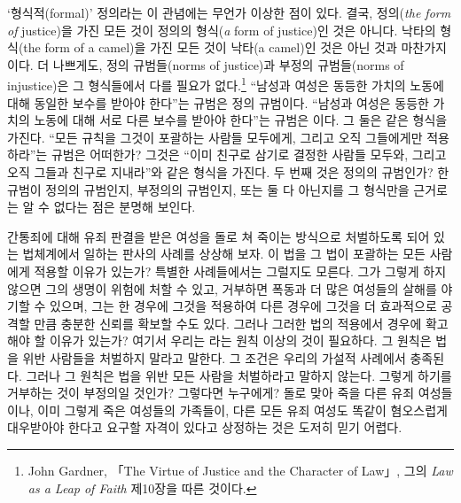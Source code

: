 ‘형식적(formal)’ 정의라는 이 관념에는 무언가 이상한 점이 있다. 결국,
정의(\emph{the form of} justice)을 가진 모든 것이 정의의
 형식(\emph{a} form of justice)인 것은 아니다. 낙타의 형식(the
form of a camel)을 가진 모든 것이 낙타(a camel)인 것은 아닌 것과
마찬가지이다. 더 나쁘게도, 정의 규범들(norms of justice)과 부정의
규범들(norms of injustice)은 그 형식들에서 다를 필요가 없다.\footnote{John
  Gardner, 「The Virtue of Justice and the Character of Law」, 그의
  \emph{Law as a Leap of Faith} 제10장을 따른 것이다.} “남성과 여성은
동등한 가치의 노동에 대해 동일한 보수를 받아야 한다”는 규범은 정의
규범이다. “남성과 여성은 동등한 가치의 노동에 대해 서로 다른 보수를
받아야 한다”는 규범은 이다. 그 둘은 같은 형식을
가진다. “모든 규칙을 그것이 포괄하는 사람들 모두에게, 그리고 오직
그들에게만 적용하라”는 규범은 어떠한가? 그것은 “이미 친구로 삼기로
결정한 사람들 모두와, 그리고 오직 그들과 친구로 지내라”와 같은 형식을
가진다. 두 번째 것은 정의의 규범인가? 한 규범이 정의의 규범인지,
부정의의 규범인지, 또는 둘 다 아닌지를 그 형식만을 근거로는 알 수 없다는
점은 분명해 보인다.

간통죄에 대해 유죄 판결을 받은 여성을 돌로 쳐 죽이는 방식으로 처벌하도록
되어 있는 법체계에서 일하는 판사의 사례를 상상해 보자. 이 법을 그 법이
포괄하는 모든 사람에게 적용할 이유가 있는가? 특별한 사례들에서는
그럴지도 모른다. 그가 그렇게 하지 않으면 그의 생명이 위험에 처할 수
있고, 거부하면 폭동과 더 많은 여성들의 살해를 야기할 수 있으며, 그는 한
경우에 그것을 적용하여 다른 경우에 그것을 더 효과적으로 공격할 만큼
충분한 신뢰를 확보할 수도 있다. 그러나 그러한 법의 적용에서
 경우에 확고해야 할 이유가 있는가? 여기서 우리는
라는 원칙 이상의 것이
필요하다. 그 원칙은 법을 위반 사람들을
처벌하지 말라고 말한다. 그 조건은 우리의 가설적 사례에서 충족된다.
그러나 그 원칙은 법을 위반 모든 사람을 처벌하라고 말하지
않는다. 그렇게 하기를 거부하는 것이 부정의일 것인가? 그렇다면 누구에게?
돌로 맞아 죽을 다른 유죄 여성들이나, 이미 그렇게 죽은 여성들의 가족들이,
다른 모든 유죄 여성도 똑같이 혐오스럽게 대우받아야 한다고 요구할 자격이
있다고 상정하는 것은 도저히 믿기 어렵다.

